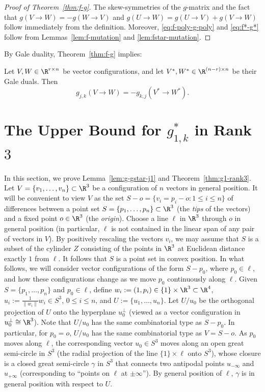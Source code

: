 %
\begin{proof}[Proof of Theorem~\ref{thm:f-g}]
The skew-symmetries of the $g$-matrix and the fact that $g(V\to W)=-g(W\to V)$ and $g(U\to W)=g(U\to V)+g(V\to W)$ follow immediately from the definition. Moreover, \eqref{eq:f-poly-g-poly} and \eqref{eq:f*-g*} follow from Lemmas~\ref {lem:f-mutation} and \ref{lem:fstar-mutation}.
\end{proof}
%
By Gale duality, Theorem~\ref{thm:f-g} implies:
\begin{corollary} Let $V,W\in \R^{r\times n}$ be vector configurations, and let $V^*,W^*\in  \R^{(n-r)\times n}$ be their Gale duals. Then
\label{cor:g-pair-dual}
\[ g_{j,k}(V \to W) = -g_{k,j}(V^* \to W^*).\]
\end{corollary}
%
\section{The Upper Bound for $g_{1,k}^*$ in Rank $3$}
\label{sec:g1-arcs}
In this section, we prove Lemma~\ref{lem:g-gstar-j1}  and Theorem~\ref{thm:g1-rank3}.
Let $V=\{v_1,\dots,v_n\}\subset \R^3$ be a configuration of $n$ vectors in general position.  It will be convenient to view $V$ as the set $S-o=\{v_i=p_i-o\colon 1\leq i\leq n\}$ of differences between a point set $S=\{p_1,\dots,p_n\} \subset \R^3$ (the \emph{tips} of the vectors) and a fixed point $o\in \R^3$ (the \emph{origin}). 
%
Choose a line $\ell$ in $\R^3$ through $o$ in general position (in particular, $\ell$ is not contained in the linear span of any pair of vectors in $V$). By positively rescaling the vectors $v_i$, 
we may assume that $S$ is a subset of the cylinder  $Z$ consisting of the points in $\R^3$ at Euclidean distance exactly $1$ from $\ell$. It follows that $S$ is a point set in convex position.
%
In what follows, we will consider vector configurations of the form $S-p_0$, where $p_0\in \ell$, and how these configurations change as we move $p_0$ continuously along $\ell$. 
Given $S=\{p_1,\dots,p_n\}$ and $p_0\in \ell$, define $w_i:=(1,p_i) \in \{1\}\times \R^3 \subset \R^4$, $u_i:=\frac{1}{\|w_i\|}w_i \in S^3$, $0\leq i\leq n$, and $U:=\{u_1,\dots, u_n\}$. Let $U/u_0$ be the orthogonal projection of $U$ onto the hyperplane $u_0^\bot$ (viewed as a vector configuration in $u_0^\bot\cong \R^3$). Note that $U/u_0$ has the same combinatorial type as $S-p_0$. In particular, for $p_0=o$, $U/u_0$ has the same combinatorial type as $V=S-o$.
As $p_0$ moves along $\ell$, the corresponding vector $u_0 \in S^3$ moves along an open great semi-circle in $S^3$ (the radial projection of the line $\{1\}\times \ell$ onto $S^3$), whose closure is a closed great semi-circle $\gamma$ in $S^3$ that connects two antipodal points $u_{-\infty}$ and $u_{+\infty}$ (corresponding to ``points on $\ell$ at $\pm \infty$''). By general position of $\ell$, $\gamma$ is in general position with respect to $U$.
